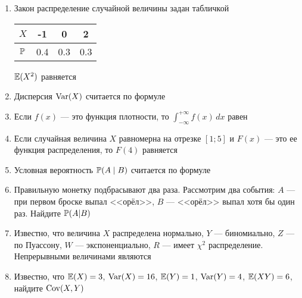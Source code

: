 \documentclass[pdftex,12pt,a4paper]{article}
\begin{document}
\begin{enumerate}
\item Закон распределение случайной величины задан табличкой


\begin{tabular}{|c|c|c|c|}
\hline 
$X$ & -1 & 0 & 2 \\ 
\hline 
$\P$ & 0.4 & 0.3 & 0.3 \\ 
\hline 
\end{tabular} 


$\E(X^2)$ равняется


\item Дисперсия $\Var(X)$ считается по формуле


\item Если $f(x)$ --- это функция плотности, то $\int_{-\infty}^{+\infty}f(x)\,dx$ равен

\item Если случайная величина $X$ равномерна на отрезке $[1;5]$ и $F(x)$ --- это ее функция распределения, то $F(4)$ равняется

\item Условная вероятность $\P(A\mid B)$ считается по формуле

\item Правильную монетку подбрасывают два раза. Рассмотрим два события: $A$ --- при первом броске выпал <<орёл>>, $B$ --- <<орёл>> выпал хотя бы один раз. Найдите $\P(A|B)$



\item Известно, что величина $X$ распределена нормально, $Y$ --- биномиально, $Z$ --- по Пуассону, $W$ --- экспоненциально, $R$ --- имеет $\chi^2$ распределение. Непрерывными величинами являются



\item Известно, что $\E(X)=3$, $\Var(X)=16$, $\E(Y)=1$, $\Var(Y)=4$, $\E(XY)=6$, найдите $\Cov(X,Y)$


\end{enumerate}
\end{document}
